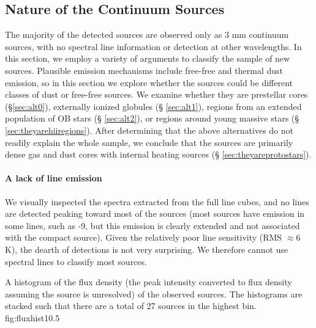 \documentclass[twocolumn]{aastex61}
\begin{document}
\subsection{Nature of the Continuum Sources}
\label{sec:classification}
The majority of the detected sources are observed only as 3 mm continuum
sources, with no spectral line information or detection at other wavelengths.
In this section, we employ a variety of arguments to classify the sample of new
sources.    Plausible emission mechanisms include free-free and thermal dust
emission, so in this section we explore whether the sources could be different
classes of dust or free-free sources.  We examine whether they are
prestellar cores (\S \ref{sec:alt0}), externally ionized globules (\S
\ref{sec:alt1}), \hii regions from an extended population of OB stars (\S
\ref{sec:alt2}), or \hii regions around young massive stars (\S
\ref{sec:theyarehiiregions}).  After determining that the above alternatives do
not readily explain the whole sample, we conclude that the sources are
primarily dense gas and dust cores with internal heating sources (\S
\ref{sec:theyareprotostars}).

\paragraph{A lack of line emission}
We visually inspected the spectra extracted from the full line cubes, and no
lines are detected peaking toward most of the sources (most sources
have emission in some lines, such as -9, but this emission is
clearly extended and not associated with the compact source).  Given the
relatively poor line sensitivity (RMS $\approx 6$ K), the dearth of detections
is not very surprising.  We therefore cannot use spectral lines to classify
most sources.



{A histogram of the flux density (the peak intensity converted to flux density
assuming the source is unresolved) of the observed sources. 
The histograms are stacked such that there are a total of 27 sources in the
highest bin.
}
{fig:fluxhist}{1}{0.5\textwidth}
\end{document}
